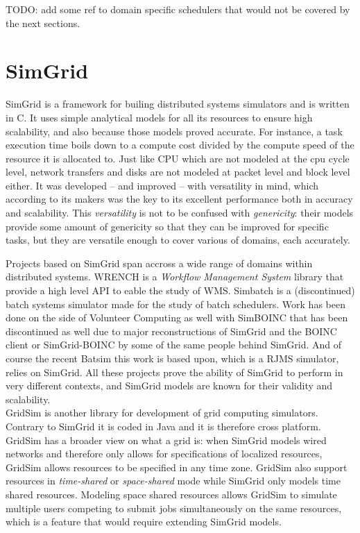 TODO: add some ref to domain specific schedulers that would not be covered by
the next sections.

\section{SimGrid}

SimGrid \cite{casanova:hal-01017319} is a framework for builing distributed
systems simulators and is written in C. It uses simple analytical models for
all its resources to ensure high scalability, and also because those models
proved accurate. For instance, a task execution time boils down to a compute
cost divided by the compute speed of the resource it is allocated to. Just like
CPU which are not modeled at the cpu cycle level, network transfers and disks
are not modeled at packet level and block level either.  It was developed --
and improved -- with versatility in mind, which according to its makers was the
key to its excellent performance both in accuracy and scalability. This
\textit{versatility} is not to be confused with \textit{genericity}: their
models provide some amount of genericity so that they can be improved for
specific tasks, but they are versatile enough to cover various of domains, each
accurately. 

Projects based on SimGrid span accross a wide range of domains within
distributed systems. WRENCH \cite{wrench} is a \textit{Workflow Management
System} library that provide a high level API to eable the study of WMS.
Simbatch \cite{simbatch} is a (discontinued) batch systems simulator made for
the study of batch schedulers.  Work has been done on the side of Volunteer
Computing as well with SimBOINC \cite{kondo2007simboinc} that has been
discontinued as well due to major reconstructions of SimGrid and the BOINC
client or SimGrid-BOINC \cite{simgrid-boinc} by some of the same people behind
SimGrid. And of course the recent Batsim \cite{dutot:hal-01333471} this work is
based upon, which is a RJMS simulator, relies on SimGrid. All these projects
prove the ability of SimGrid to perform in very different contexts, and SimGrid
models are known for their validity and scalability.\\

GridSim \cite{gridsim} is another library for development of grid computing
simulators. Contrary to SimGrid it is coded in Java and it is therefore cross
platform. GridSim has a broader view on what a grid is: when SimGrid models
wired networks and therefore only allows for specifications of localized
resources, GridSim allows resources to be specified in any time zone. GridSim
also support resources in \textit{time-shared} or \textit{space-shared} mode
while SimGrid only models time shared resources. Modeling space shared
resources allows GridSim to simulate multiple users competing to submit jobs
simultaneously on the same resources, which is a feature that would require
extending SimGrid models.

